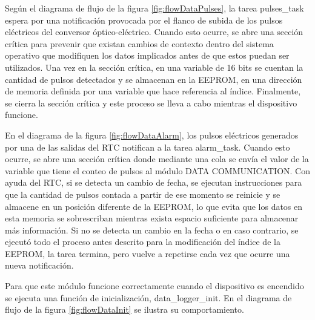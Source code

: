 Según el diagrama de flujo de la figura \ref{fig:flowDataPulses}, la tarea pulses\_task espera por una notificación provocada por el flanco de subida de los pulsos eléctricos del conversor óptico-eléctrico. Cuando esto ocurre, se abre una sección crítica para prevenir que existan cambios de contexto dentro del sistema operativo que modifiquen los datos implicados antes de que estos puedan ser utilizados. Una vez en la sección crítica, en una variable de 16 bits se cuentan la cantidad de pulsos detectados y se almacenan en la EEPROM, en una dirección de memoria definida por una variable que hace referencia al índice. Finalmente, se cierra la sección crítica y este proceso se lleva a cabo mientras el dispositivo funcione.

En el diagrama de la figura \ref{fig:flowDataAlarm}, los pulsos eléctricos generados por una de las salidas del RTC notifican a la tarea alarm\_task. Cuando esto ocurre, se abre una sección crítica donde mediante una cola se envía el valor de la variable que tiene el conteo de pulsos al módulo DATA COMMUNICATION. Con ayuda del RTC, si se detecta un cambio de fecha, se ejecutan instrucciones para que la cantidad de pulsos contada a partir de ese momento se reinicie y se almacene en un posición diferente de la EEPROM, lo que evita que los datos en esta memoria se sobrescriban mientras exista espacio suficiente para almacenar más información. Si no se detecta un cambio en la fecha o en caso contrario, se ejecutó todo el proceso antes descrito para la modificación del índice de la EEPROM, la tarea termina, pero vuelve a repetirse cada vez que ocurre una nueva notificación.

Para que este módulo funcione correctamente cuando el dispositivo es encendido se ejecuta una función de inicialización, data\_logger\_init. En el diagrama de flujo de la figura \ref{fig:flowDataInit} se ilustra su comportamiento.

